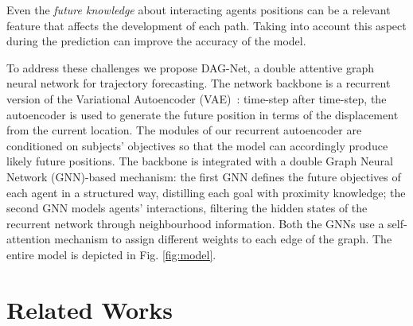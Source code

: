 \documentclass[10pt,a4paper,conference]{IEEEtran}
\begin{document}
Even the \emph{future knowledge} about interacting agents positions can be a relevant feature that affects the development of each path. Taking into account this aspect during the prediction can improve the accuracy of the model.

To address these challenges we propose DAG-Net, a double attentive graph neural network for trajectory forecasting. The network backbone is a recurrent version of the Variational Autoencoder (VAE)~\cite{vae}: time-step after time-step, the autoencoder is used to generate the future position in terms of the displacement from the current location. The modules of our recurrent autoencoder are conditioned on subjects' objectives so that the model can accordingly produce likely future positions. The backbone is integrated with a double Graph Neural Network (GNN)-based mechanism: the first GNN defines the future objectives of each agent in a structured way, distilling each goal with proximity knowledge; the second GNN models agents' interactions, filtering the hidden states of the recurrent network through neighbourhood information. Both the GNNs use a self-attention mechanism to assign different weights to each edge of the graph. The entire model is depicted in Fig. \ref{fig:model}.


 \section{Related Works}
\end{document}
